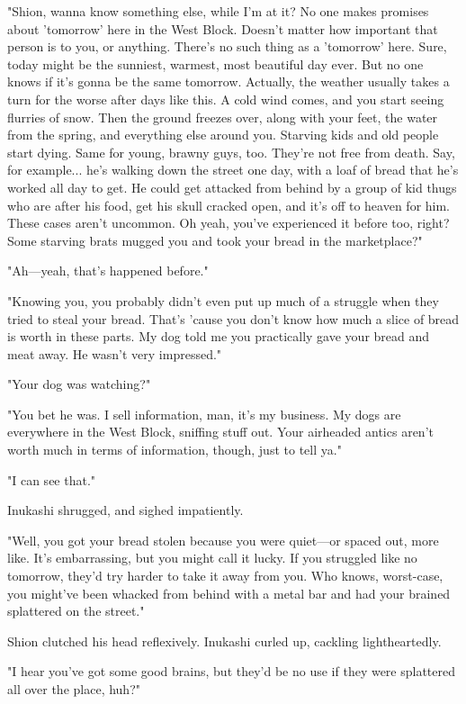 "Shion, wanna know something else, while I'm at it? No one makes
promises about 'tomorrow' here in the West Block. Doesn't matter how
important that person is to you, or anything. There's no such thing as a
'tomorrow' here. Sure, today might be the sunniest, warmest, most
beautiful day ever. But no one knows if it's gonna be the same tomorrow.
Actually, the weather usually takes a turn for the worse after days like
this. A cold wind comes, and you start seeing flurries of snow. Then the
ground freezes over, along with your feet, the water from the spring,
and everything else around you. Starving kids and old people start
dying. Same for young, brawny guys, too. They're not free from death.
Say, for example... he's walking down the street one day, with a loaf of
bread that he's worked all day to get. He could get attacked from behind
by a group of kid thugs who are after his food, get his skull cracked
open, and it's off to heaven for him. These cases aren't uncommon. Oh
yeah, you've experienced it before too, right? Some starving brats
mugged you and took your bread in the marketplace?"

"Ah---yeah, that's happened before."

"Knowing you, you probably didn't even put up much of a struggle when
they tried to steal your bread. That's 'cause you don't know how much a
slice of bread is worth in these parts. My dog told me you practically
gave your bread and meat away. He wasn't very impressed."

"Your dog was watching?"

"You bet he was. I sell information, man, it's my business. My dogs are
everywhere in the West Block, sniffing stuff out. Your airheaded antics
aren't worth much in terms of information, though, just to tell ya."

"I can see that."

Inukashi shrugged, and sighed impatiently.

"Well, you got your bread stolen because you were quiet---or spaced out,
more like. It's embarrassing, but you might call it lucky. If you
struggled like no tomorrow, they'd try harder to take it away from you.
Who knows, worst-case, you might've been whacked from behind with a
metal bar and had your brained splattered on the street."

Shion clutched his head reflexively. Inukashi curled up, cackling
lightheartedly.

"I hear you've got some good brains, but they'd be no use if they were
splattered all over the place, huh?"

